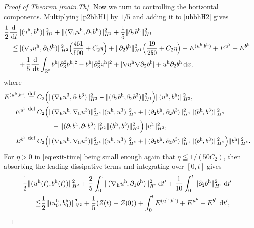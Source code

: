 \documentclass[11pt]{amsart}
\theoremstyle{definition}
\newcommand{\R}{\mathbb{R}}
\def\eqdefa{\buildrel\hbox{\footnotesize def}\over =}
\newcommand{\dx}{\,{\rm d}x}
\newcommand{\dt}{\,{\rm d}t}
\numberwithin{equation}{section}
\begin{document}
\begin{proof}[Proof of Theorem \ref{main.Th}]
	Now we turn to controlling the horizontal components. Multiplying \eqref{p2bhH1} by $1/5$ and adding it to \eqref{uhbhH2} gives
	\begin{align*}
		\frac12 \frac{\mathrm{d}}{\dt}&\|(u^\mathrm{h},b^\mathrm{h})\|^2_{H^2}+\|(\nabla_{\mathrm{h}} u^\mathrm{h},\partial_1b^\mathrm{h})\|^2_{H^2}+\frac{1}{5}\|\partial_2 b^\mathrm{h}\|_{H^1}^2\\
		\leqq & \|(\nabla_{\mathrm{h}} u^\mathrm{h},\partial_1b^\mathrm{h})\|_{H^2}^2\Bigl(\frac{461}{500}+C_2\eta\Bigr)+\|\partial_2b^\mathrm{h}\|_{H^1}^2\Bigl(\frac{19}{250}+C_2\eta\Bigr)+E^{(u^\mathrm{h},b^\mathrm{h})}+E^{u^\mathrm{h}}+E^{b^\mathrm{h}}\\
		&+\frac15\frac{\mathrm{d}}{\dt}\int_{\R^3} b^\mathrm{h} |\partial_3^2b^\mathrm{h} |^2-b^\mathrm{h} |\partial_3^2u^\mathrm{h} |^2+|\nabla u^\mathrm{h} \nabla\partial_{2}b^\mathrm{h} |+ u^\mathrm{h} \partial_2 b^\mathrm{h} \dx,
	\end{align*}
	where
	\begin{align*}
		E^{(u^\mathrm{h},b^\mathrm{h})}&\eqdefa C_2\Bigl(\|(\nabla_{\mathrm{h}} u^3,\partial_1b^3)\|_{H^2}^2+\|(\partial_2b^\mathrm{h},\partial_2b^3)\|_{H^1}^2\Bigr)\|(u^\mathrm{h},b^\mathrm{h})\|_{H^2}^2,\\
		E^{u^\mathrm{h}}&\eqdefa C_2\Bigl(\|(\nabla_{\mathrm{h}} u^\mathrm{h},\nabla_{\mathrm{h}} u^3)\|_{H^2}^2\|( u^\mathrm{h}, u^3)\|_{H^2}^2+ \|(\partial_2b^\mathrm{h},\partial_2b^3)\|_{H^1}^2\|(b^\mathrm{h},b^3)\|_{H^2}^2\\
		&\qquad\qquad+\|(\partial_1b^\mathrm{h},\partial_1b^3)\|_{H^2}^2\|(b^\mathrm{h},b^3)\|_{H^2}^2\Bigr)\|u^\mathrm{h}\|_{H^2}^2,\\
		E^{b^\mathrm{h}}&\eqdefa C_2\Bigl(\|(\nabla_{\mathrm{h}} u^\mathrm{h},\nabla_{\mathrm{h}} u^3)\|_{H^2}^2\|( u^\mathrm{h}, u^3)\|_{H^2}^2+ \|(\partial_2b^\mathrm{h},\partial_2b^3)\|_{H^1}^2\|(b^\mathrm{h},b^3)\|_{H^2}^2\Bigr)\|b^\mathrm{h}\|_{H^2}^2 .
	\end{align*}
	For $\eta > 0$ in \eqref{eq:exit-time} being small enough again that $\eta\leqq1/(50C_2)$, then absorbing  the leading dissipative terms and integrating over $[0,t]$ gives
	\begin{align}\label{eq:horiz-ineq}
		\frac12 \|(u^\mathrm{h}&(t),b^\mathrm{h}(t))\|^2_{H^2}+\frac{2}{5}\int_{0}^{t}\|(\nabla_{\mathrm{h}} u^\mathrm{h},\partial_1b^\mathrm{h})\|_{H^2}^2\dt'+\frac{1}{10}\int_{0}^{t}\|\partial_2 b^\mathrm{h}\|_{H^1}^2\dt'\nonumber\\
		\leqq & \frac12 \|(u^\mathrm{h}_0,b^\mathrm{h}_0)\|^2_{H^2}+\frac15(Z(t)-Z(0))+\int_{0}^{t}E^{(u^\mathrm{h},b^\mathrm{h})}+E^{u^\mathrm{h}}+E^{b^\mathrm{h}}\dt',

\end{align}
\end{proof}
\end{document}
